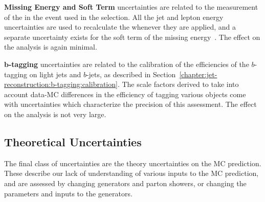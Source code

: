 	\textbf{Missing Energy and Soft Term} uncertainties are related to the measurement of the \met in the event used in the selection. All the jet and lepton energy uncertainties are used to recalculate the \met whenever they are applied, and a separate uncertainty exists for the soft term of the missing energy~\cite{Aad:2012re,ATLAS-CONF-2013-082}. The effect on the analysis is again minimal.

	\textbf{$\mathbf{b}$-tagging} uncertainties are related to the calibration of the efficiencies of the $b$-tagging on light jets and $b$-jets, as described in Section~\ref{chapter:jet-reconstruction:b-tagging:calibration}. The scale factors derived to take into account data-MC differences in the efficiency of tagging various objects come with uncertainties which characterize the precision of this assessment. The effect on the analysis is not very large.


	\subsection{Theoretical Uncertainties}
	\label{chapter:color:uncertainties:theory}

	The final class of uncertainties are the theory uncertainties on the MC prediction. These describe our lack of understanding of various inputs to the MC prediction, and are assessed by changing generators and parton showers, or changing the parameters and inputs to the generators.


